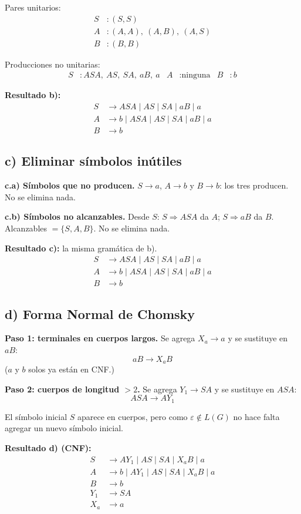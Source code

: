 \documentclass[11pt]{article}
\newcommand{\eps}{\varepsilon}
\begin{document}
Pares unitarios:
\begin{align*}
S &: (S,S)\\
A &: (A,A),\ (A,B),\ (A,S)\\
B &: (B,B)
\end{align*}

Producciones no unitarias:
\begin{align*}
S &: ASA,\ AS,\ SA,\ aB,\ a & A &: \text{ninguna} & B &: b
\end{align*}

\textbf{Resultado b):}
\begin{align*}
S &\to ASA \mid AS \mid SA \mid aB \mid a\\
A &\to b \mid ASA \mid AS \mid SA \mid aB \mid a\\
B &\to b
\end{align*}

\subsection*{c) Eliminar s\'imbolos in\'utiles}

\textbf{c.a) S\'imbolos que no producen.} $S \to a$, $A \to b$ y $B \to b$: los tres producen. No se elimina nada.

\textbf{c.b) S\'imbolos no alcanzables.} Desde $S$: $S \Rightarrow ASA$ da $A$; $S \Rightarrow aB$ da $B$. Alcanzables $=\{S,A,B\}$. No se elimina nada.

\textbf{Resultado c):} la misma gram\'atica de b).
\begin{align*}
S &\to ASA \mid AS \mid SA \mid aB \mid a\\
A &\to b \mid ASA \mid AS \mid SA \mid aB \mid a\\
B &\to b
\end{align*}

\subsection*{d) Forma Normal de Chomsky}

\textbf{Paso 1: terminales en cuerpos largos.} Se agrega $X_a \to a$ y se sustituye en $aB$:
\[ aB \to X_a B \]
($a$ y $b$ solos ya est\'an en CNF.)

\textbf{Paso 2: cuerpos de longitud $>2$.} Se agrega $Y_1 \to SA$ y se sustituye en $ASA$:
\[ ASA \to A Y_1 \]

El s\'imbolo inicial $S$ aparece en cuerpos, pero como $\eps \notin L(G)$ no hace falta agregar un nuevo s\'imbolo inicial.

\textbf{Resultado d) (CNF):}
\begin{align*}
S &\to A Y_1 \mid AS \mid SA \mid X_a B \mid a\\
A &\to b \mid A Y_1 \mid AS \mid SA \mid X_a B \mid a\\
B &\to b\\
Y_1 &\to SA\\
X_a &\to a
\end{align*}
\end{document}
